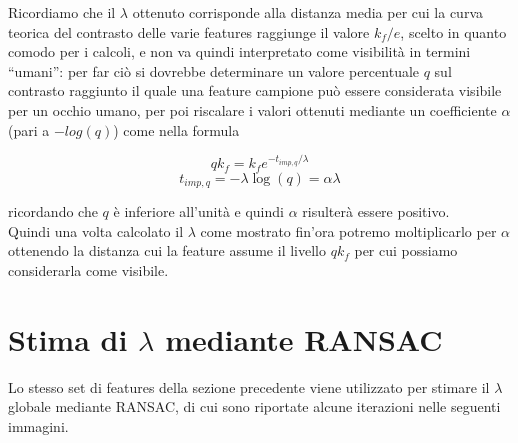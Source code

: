 \documentclass[12pt]{report}
\begin{document}
\noindent Ricordiamo che il $\lambda$ ottenuto corrisponde alla distanza media per cui la curva teorica del contrasto delle varie features raggiunge il valore $k_f/e$, scelto in quanto comodo per i calcoli, e non va quindi interpretato come visibilit\`a in termini ``umani'': per far ci\`o si dovrebbe determinare un valore percentuale $q$ sul contrasto raggiunto il quale una feature campione pu\`o essere considerata visibile per un occhio umano, per poi riscalare i valori ottenuti mediante un coefficiente $\alpha$ (pari a $-log\left(q\right)$) come nella formula

$$qk_f = k_fe^{-t_{imp,q}/\lambda}$$
$$t_{imp,q} = -\lambda\log \left(q\right) = \alpha\lambda$$

\noindent ricordando che $q$ \`e inferiore all'unit\`a e quindi $\alpha$ risulter\`a essere positivo. \\
\noindent Quindi una volta calcolato il $\lambda$ come mostrato fin'ora potremo moltiplicarlo per $\alpha$ ottenendo la distanza cui la feature assume il livello $qk_f$ per cui possiamo considerarla come visibile.\\


\newpage
\section{Stima di $\lambda$ mediante RANSAC}
\label{ransactest}

\noindent Lo stesso set di features della sezione precedente viene utilizzato per stimare il $\lambda$ globale mediante RANSAC, di cui sono riportate alcune iterazioni nelle seguenti immagini.
\end{document}
